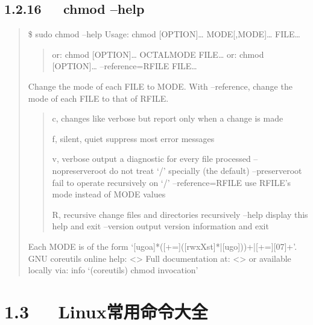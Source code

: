 \documentclass[letterpaper,12pt,english]{sphinxmanual}
\begin{document}
\subsection{1.2.16   chmod –help}
\label{\detokenize{001software/001install/linux:chmod-help}}\begin{quote}

\$ sudo chmod –help
Usage: chmod {[}OPTION{]}… MODE{[},MODE{]}… FILE…
\begin{quote}

or:  chmod {[}OPTION{]}… OCTAL\sphinxhyphen{}MODE FILE…
or:  chmod {[}OPTION{]}… –reference=RFILE FILE…
\end{quote}

Change the mode of each FILE to MODE.
With –reference, change the mode of each FILE to that of RFILE.
\begin{quote}
\begin{optionlist}{3cm}
\item [\sphinxhyphen{}c, \sphinxhyphen{}\sphinxhyphen{}changes]  
like verbose but report only when a change is made
\item [\sphinxhyphen{}f, \sphinxhyphen{}\sphinxhyphen{}silent, \sphinxhyphen{}\sphinxhyphen{}quiet]  
suppress most error messages
\item [\sphinxhyphen{}v, \sphinxhyphen{}\sphinxhyphen{}verbose]  
output a diagnostic for every file processed
–no\sphinxhyphen{}preserve\sphinxhyphen{}root  do not treat ‘/’ specially (the default)
–preserve\sphinxhyphen{}root    fail to operate recursively on ‘/’
–reference=RFILE  use RFILE’s mode instead of MODE values
\item [\sphinxhyphen{}R, \sphinxhyphen{}\sphinxhyphen{}recursive]  
change files and directories recursively
–help     display this help and exit
–version  output version information and exit
\end{optionlist}
\end{quote}

Each MODE is of the form ‘{[}ugoa{]}*({[}\sphinxhyphen{}+={]}({[}rwxXst{]}*|{[}ugo{]}))+|{[}\sphinxhyphen{}+={]}{[}0\sphinxhyphen{}7{]}+’.
GNU coreutils online help: <>
Full documentation at: <>
or available locally via: info ‘(coreutils) chmod invocation’
\end{quote}


\section{1.3   Linux常用命令大全}
\label{\detokenize{001software/001install/linux:linux}}
\end{document}

